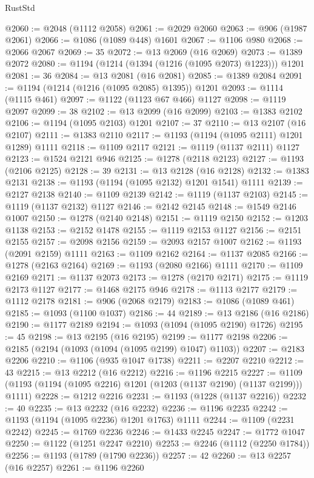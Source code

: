 \begin{lexlean}{RustStd}
\begin{coremodule}
@2060 := @2048 (@1112 @2058)
@2061 := @2029 @2060
@2063 := @906 (@1987 @2061)
@2066 := @1086 (@1089 @448) @1601
@2067 := @1106 @980
@2068 := @2066 @2067
@2069 := 35
@2072 := @13 @2069 (@16 @2069)
@2073 := @1389 @2072
@2080 := @1194 (@1214 (@1394 (@1216 (@1095 @2073) @1223))) @1201
@2081 := 36
@2084 := @13 @2081 (@16 @2081)
@2085 := @1389 @2084
@2091 := @1194 (@1214 (@1216 (@1095 @2085) @1395)) @1201
@2093 := @1114 (@1115 @461)
@2097 := @1122 (@1123 @67 @466) @1127
@2098 := @1119 @2097
@2099 := 38
@2102 := @13 @2099 (@16 @2099)
@2103 := @1383 @2102
@2106 := @1194 (@1095 @2103) @1201
@2107 := 37
@2110 := @13 @2107 (@16 @2107)
@2111 := @1383 @2110
@2117 := @1193 (@1194 (@1095 @2111) @1201 @1289) @1111
@2118 := @1109 @2117
@2121 := @1119 (@1137 @2111) @1127
@2123 := @1524 @2121 @946
@2125 := @1278 (@2118 @2123)
@2127 := @1193 (@2106 @2125)
@2128 := 39
@2131 := @13 @2128 (@16 @2128)
@2132 := @1383 @2131
@2138 := @1193 (@1194 (@1095 @2132) @1201 @1541) @1111
@2139 := @2127 @2138
@2140 := @1109 @2139
@2142 := @1119 (@1137 @2103)
@2145 := @1119 (@1137 @2132) @1127
@2146 := @2142 @2145
@2148 := @1549 @2146 @1007
@2150 := @1278 (@2140 @2148)
@2151 := @1119 @2150
@2152 := @1203 @1138
@2153 := @2152 @1478
@2155 := @1119 @2153 @1127
@2156 := @2151 @2155
@2157 := @2098 @2156
@2159 := @2093 @2157 @1007
@2162 := @1193 (@2091 @2159) @1111
@2163 := @1109 @2162
@2164 := @1137 @2085
@2166 := @1278 (@2163 @2164)
@2169 := @1193 (@2080 @2166) @1111
@2170 := @1109 @2169
@2171 := @1137 @2073
@2173 := @1278 (@2170 @2171)
@2175 := @1119 @2173 @1127
@2177 := @1468 @2175 @946
@2178 := @1113 @2177
@2179 := @1112 @2178
@2181 := @906 (@2068 @2179)
@2183 := @1086 (@1089 @461)
@2185 := @1093 (@1100 @1037)
@2186 := 44
@2189 := @13 @2186 (@16 @2186)
@2190 := @1177 @2189
@2194 := @1093 (@1094 (@1095 @2190) @1726)
@2195 := 45
@2198 := @13 @2195 (@16 @2195)
@2199 := @1177 @2198
@2206 := @2185 (@2194 (@1093 (@1094 (@1095 @2199) @1047) @1103))
@2207 := @2183 @2206
@2210 := @1106 (@935 @1047 @1738)
@2211 := @2207 @2210
@2212 := 43
@2215 := @13 @2212 (@16 @2212)
@2216 := @1196 @2215
@2227 := @1109 (@1193 (@1194 (@1095 @2216) @1201 (@1203 (@1137 @2190) (@1137 @2199))) @1111)
@2228 := @1212 @2216
@2231 := @1193 (@1228 (@1137 @2216))
@2232 := 40
@2235 := @13 @2232 (@16 @2232)
@2236 := @1196 @2235
@2242 := @1193 (@1194 (@1095 @2236) @1201 @1763) @1111
@2244 := @1109 (@2231 @2242)
@2245 := @1769 @2236
@2246 := @1433 @2245
@2247 := @1772 @1047
@2250 := @1122 (@1251 @2247 @2210)
@2253 := @2246 (@1112 (@2250 @1784))
@2256 := @1193 (@1789 (@1790 @2236))
@2257 := 42
@2260 := @13 @2257 (@16 @2257)
@2261 := @1196 @2260

\end{coremodule}
\end{lexlean}
